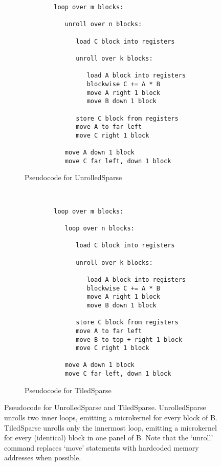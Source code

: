 \begin{figure}[ht]
  \begin{subfigure}[b]{0.45\textwidth}
      \begin{verbatim}
        loop over m blocks:

           unroll over n blocks:

              load C block into registers

              unroll over k blocks:

                 load A block into registers
                 blockwise C += A * B
                 move A right 1 block
                 move B down 1 block

              store C block from registers
              move A to far left
              move C right 1 block

           move A down 1 block
           move C far left, down 1 block
      \end{verbatim}    
      \caption{Pseudocode for UnrolledSparse}
    \label{fig:pseudocode_unrolled}
  \end{subfigure}
  ~~~~~~
  \begin{subfigure}[b]{0.45\textwidth}
      \begin{verbatim}
        loop over m blocks:

           loop over n blocks:

              load C block into registers

              unroll over k blocks:

                 load A block into registers
                 blockwise C += A * B
                 move A right 1 block
                 move B down 1 block

              store C block from registers
              move A to far left
              move B to top + right 1 block
              move C right 1 block

           move A down 1 block
           move C far left, down 1 block
      \end{verbatim}    
      \caption{Pseudocode for TiledSparse}
    \label{fig:pseudocode_tiled}

  \end{subfigure}
    \caption{Pseudocode for UnrolledSparse and TiledSparse. UnrolledSparse unrolls two inner loops, emitting a microkernel for every block of B. TiledSparse unrolls only the innermost loop, emitting a microkernel for every (identical) block in one panel of B. Note that the `unroll' command replaces `move' statements with hardcoded memory addresses when possible.}
    \label{fig:pseudocode_unrolled_tiled}

\end{figure}



